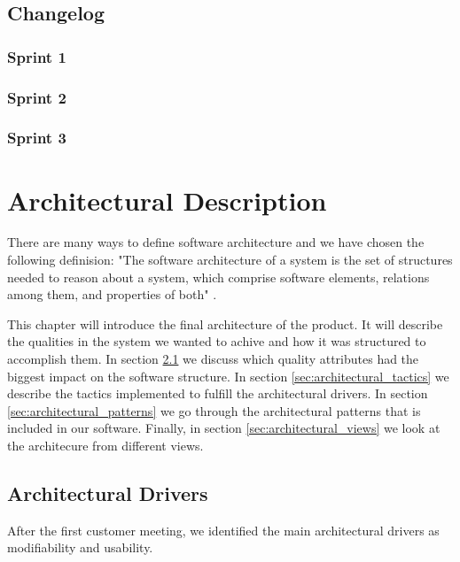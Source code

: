\documentclass{report}
\begin{document}
\newpage
\section{Changelog} \label{sec:changelog}
\subsection{Sprint 1} \label{subsec:sprint_1}
\subsection{Sprint 2} \label{subsec:sprint_2}
\subsection{Sprint 3} \label{subsec:sprint_3}









\chapter{Architectural Description} \label{cha:architectural_description}
There are many ways to define software architecture and we have chosen the following definision: "The software architecture of a system is the set of structures needed to reason about a system, which comprise software elements, relations among them, and properties of both" \cite[p. 4]{book:bass}.

This chapter will introduce the final architecture of the product. It will describe the qualities in the system we wanted to achive and how it was structured to accomplish them. In section \ref{sec:architectural_drivers} we discuss which quality attributes had the biggest impact on the software structure. In section \ref{sec:architectural_tactics} we describe the tactics implemented to fulfill the architectural drivers. In section \ref{sec:architectural_patterns} we go through the architectural patterns that is included in our software. Finally, in section \ref{sec:architectural_views} we look at the architecure from different views.

\newpage
\section{Architectural Drivers} \label{sec:architectural_drivers}
After the first customer meeting, we identified the main architectural drivers as modifiability and usability.
\end{document}
